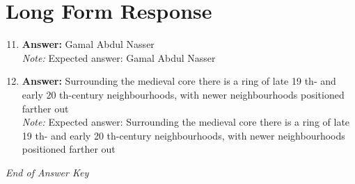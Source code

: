 \documentclass[12pt]{article}
\begin{document}
\section*{Long Form Response}
\begin{enumerate}[label=\arabic*.]
\setcounter{enumi}{10}
\item \textbf{Answer:} Gamal Abdul Nasser
\\ \textit{Note:} Expected answer: Gamal Abdul Nasser
\item \textbf{Answer:} Surrounding the medieval core there is a ring of late 19 th- and early 20 th-century neighbourhoods, with newer neighbourhoods positioned farther out
\\ \textit{Note:} Expected answer: Surrounding the medieval core there is a ring of late 19 th- and early 20 th-century neighbourhoods, with newer neighbourhoods positioned farther out
\end{enumerate}

\vfill
\noindent\textit{End of Answer Key}
\end{document}

